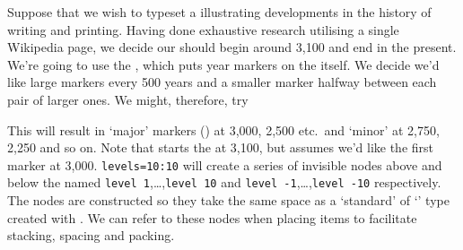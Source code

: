 \documentclass[10pt,british,a4paper]{ltxdoc}
\newcommand*\pkg[1]{\textpkg{#1}}
\begin{document}
Suppose that we wish to typeset a  illustrating developments in the history of writing and printing.
Having done exhaustive research utilising a single Wikipedia page, we decide our  should begin around 3,100\bceyearlabel{} and end in the present. 
We're going to use the \chronosstylelabelname{} , which puts year markers on the  itself.
We decide we'd like large markers every 500 years and a smaller marker halfway between each pair of larger ones.
We might, therefore, try
\begin{chronoscode}
\begin{chronos}
  [
    cronoleg,%
    timeline={%
      start date={-3100},
      end date=2100,
      minor step=250,
      major step=500,
    },
    levels=10:10,
  ]
\end{chronoscode}
This will result in ‘major’ markers () at 3,000\bceyearlabel{}, 2,500 \bceyearlabel{} etc.\ and ‘minor’ at 2,750\bceyearlabel{}, 2,250\bceyearlabel{} and so on.
Note that \pkg{chronos} starts the  at 3,100\bceyearlabel{}, but assumes we'd like the first marker at 3,000\bceyearlabel{}.
\texttt{levels=10:10} will create a series of invisible nodes above and below the  named \texttt{level 1},\dots{},\texttt{level 10} and \texttt{level -1},\dots{},\texttt{level -10} respectively. 
The nodes are constructed so they take the same space as a ‘standard’  of ‘\taglabelname{}’ type  created with .
We can refer to these nodes when placing items to facilitate stacking, spacing and packing.
\end{document}
